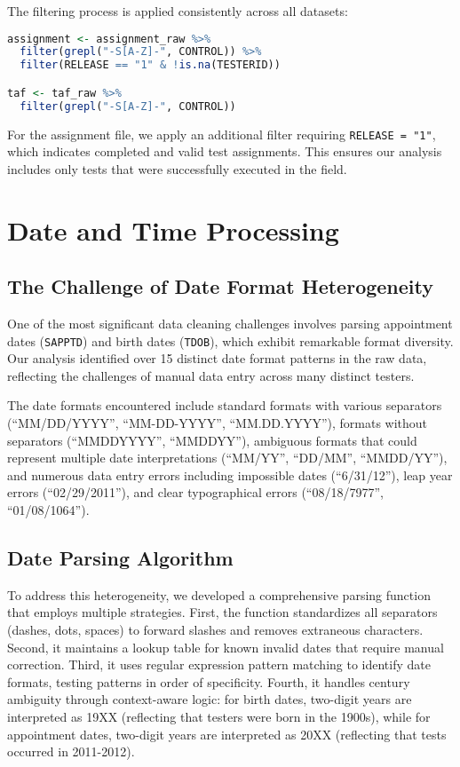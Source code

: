 \documentclass{article}
\begin{document}
The filtering process is applied consistently across all datasets:

\begin{lstlisting}[language=R]
assignment <- assignment_raw %>%
  filter(grepl("-S[A-Z]-", CONTROL)) %>%
  filter(RELEASE == "1" & !is.na(TESTERID))

taf <- taf_raw %>%
  filter(grepl("-S[A-Z]-", CONTROL))
\end{lstlisting}

For the assignment file, we apply an additional filter requiring \texttt{RELEASE = "1"}, which indicates completed and valid test assignments. This ensures our analysis includes only tests that were successfully executed in the field.

\section{Date and Time Processing}

\subsection{The Challenge of Date Format Heterogeneity}

One of the most significant data cleaning challenges involves parsing appointment dates (\texttt{SAPPTD}) and birth dates (\texttt{TDOB}), which exhibit remarkable format diversity. Our analysis identified over 15 distinct date format patterns in the raw data, reflecting the challenges of manual data entry across many distinct testers.

The date formats encountered include standard formats with various separators (``MM/DD/YYYY'', ``MM-DD-YYYY'', ``MM.DD.YYYY''), formats without separators (``MMDDYYYY'', ``MMDDYY''), ambiguous formats that could represent multiple date interpretations (``MM/YY'', ``DD/MM'', ``MMDD/YY''), and numerous data entry errors including impossible dates (``6/31/12''), leap year errors (``02/29/2011''), and clear typographical errors (``08/18/7977'', ``01/08/1064'').

\subsection{Date Parsing Algorithm}

To address this heterogeneity, we developed a comprehensive parsing function that employs multiple strategies. First, the function standardizes all separators (dashes, dots, spaces) to forward slashes and removes extraneous characters. Second, it maintains a lookup table for known invalid dates that require manual correction. Third, it uses regular expression pattern matching to identify date formats, testing patterns in order of specificity. Fourth, it handles century ambiguity through context-aware logic: for birth dates, two-digit years are interpreted as 19XX (reflecting that testers were born in the 1900s), while for appointment dates, two-digit years are interpreted as 20XX (reflecting that tests occurred in 2011-2012).
\end{document}
